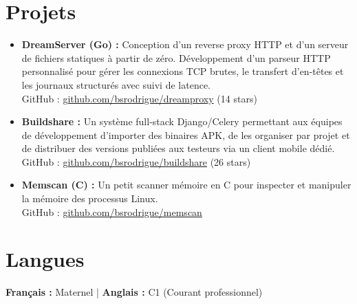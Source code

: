 \documentclass[a4paper,10pt]{article}
\begin{document}
\section*{Projets}
\begin{itemize}[leftmargin=*,nosep]
    \item \textbf{DreamServer (Go) :} Conception d'un reverse proxy HTTP et d'un serveur de fichiers statiques à partir de zéro. Développement d'un parseur HTTP personnalisé pour gérer les connexions TCP brutes, le transfert d'en-têtes et les journaux structurés avec suivi de latence. \\
    GitHub : \href{https://github.com/bsrodrigue/dreamproxy}{github.com/bsrodrigue/dreamproxy} (14 stars)
    \item \textbf{Buildshare :} Un système full-stack Django/Celery permettant aux équipes de développement d'importer des binaires APK, de les organiser par projet et de distribuer des versions publiées aux testeurs via un client mobile dédié. \\
    GitHub : \href{https://github.com/bsrodrigue/buildshare}{github.com/bsrodrigue/buildshare} (26 stars)
    \item \textbf{Memscan (C) :} Un petit scanner mémoire en C pour inspecter et manipuler la mémoire des processus Linux. \\
    GitHub : \href{https://github.com/bsrodrigue/memscan}{github.com/bsrodrigue/memscan}
\end{itemize}

\vspace{0.1cm}

\section*{Langues}
\textbf{Français :} Maternel | \textbf{Anglais :} C1 (Courant professionnel)
\end{document}
